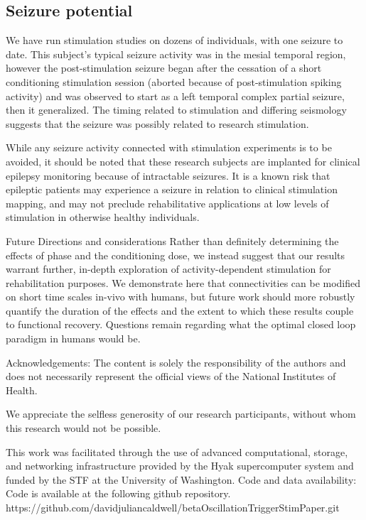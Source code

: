 \subsection{Seizure potential}
We have run stimulation studies on dozens of individuals, with one seizure to date. This subject’s typical seizure activity was in the mesial temporal region, however the post-stimulation seizure began after the cessation of a short conditioning stimulation session (aborted because of post-stimulation spiking activity) and was observed to start as a left temporal complex partial seizure, then it generalized. The timing related to stimulation and differing seismology suggests that the seizure was possibly related to research stimulation. 

While any seizure activity connected with stimulation experiments is to be avoided, it should be noted that these research subjects are implanted for clinical epilepsy monitoring because of intractable seizures. It is a known risk that epileptic patients may experience a seizure in relation to clinical stimulation mapping, and may not preclude rehabilitative applications at low levels of stimulation in otherwise healthy individuals. 

Future Directions and considerations
Rather than definitely determining the effects of phase and the conditioning dose, we instead suggest that our results warrant further, in-depth exploration of activity-dependent stimulation for rehabilitation purposes. We demonstrate here that connectivities can be modified on short time scales in-vivo with humans, but future work should more robustly quantify the duration of the effects and the extent to which these results couple to functional recovery. Questions remain regarding what the optimal closed loop paradigm in humans would be. 

Acknowledgements:
The content is solely the responsibility of the authors and does not necessarily represent the official views of the National Institutes of Health.

We appreciate the selfless generosity of our research participants, without whom this research would not be possible. 

This work was facilitated through the use of advanced computational, storage, and networking infrastructure provided by the Hyak supercomputer system and funded by the STF at the University of Washington.
Code and data availability:
Code is available at the following github repository. 
https://github.com/davidjuliancaldwell/betaOscillationTriggerStimPaper.git

